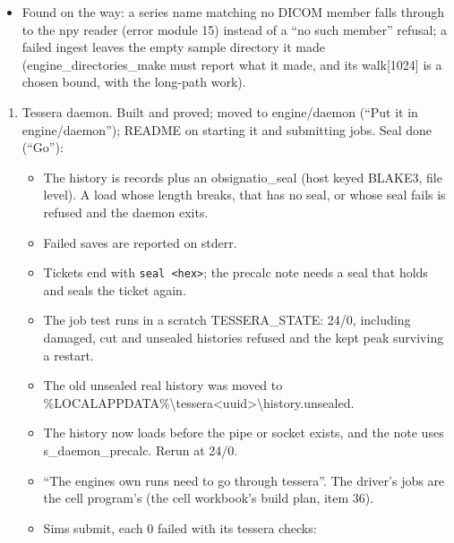 \begin{itemize}
\item Found on the way: a series name matching no DICOM member falls through to the npy reader (error module 15) instead of a “no such member” refusal; a failed ingest leaves the empty sample directory it made (engine\_\allowbreak{}directories\_\allowbreak{}make must report what it made, and its walk[1024] is a chosen bound, with the long-path work).
\end{itemize}

\begin{enumerate}
\item Tessera daemon. Built and proved; moved to engine/daemon (“Put it in engine/daemon”); README on starting it and submitting jobs. Seal done (“Go”):

\begin{itemize}
\item The history is records plus an obsignatio\_\allowbreak{}seal (host keyed BLAKE3, file level). A load whose length breaks, that has no seal, or whose seal fails is refused and the daemon exits.
\item Failed saves are reported on stderr.
\item Tickets end with \texttt{seal <hex>}; the precalc note needs a seal that holds and seals the ticket again.
\item The job test runs in a scratch TESSERA\_\allowbreak{}STATE: 24/0, including damaged, cut and unsealed histories refused and the kept peak surviving a restart.
\item The old unsealed real history was moved to \%LOCALAPPDATA\%\textbackslash{}tessera<uuid>\textbackslash{}history.unsealed.
\item The history now loads before the pipe or socket exists, and the note uses s\_\allowbreak{}daemon\_\allowbreak{}precalc. Rerun at 24/0.
\item “The engines own runs need to go through tessera”. The driver's jobs are the cell program's (the cell workbook's build plan, item 36).
\item Sims submit, each 0 failed with its tessera checks:


\end{itemize}
\end{enumerate}
